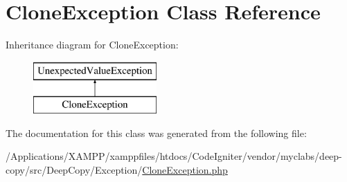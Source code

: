 \hypertarget{class_deep_copy_1_1_exception_1_1_clone_exception}{}\section{Clone\+Exception Class Reference}
\label{class_deep_copy_1_1_exception_1_1_clone_exception}
Inheritance diagram for Clone\+Exception\+:\begin{figure}[H]
\begin{center}
\leavevmode
\includegraphics[height=2.000000cm]{class_deep_copy_1_1_exception_1_1_clone_exception}
\end{center}
\end{figure}


The documentation for this class was generated from the following file\+:\begin{DoxyCompactItemize}
\item 
/\+Applications/\+X\+A\+M\+P\+P/xamppfiles/htdocs/\+Code\+Igniter/vendor/myclabs/deep-\/copy/src/\+Deep\+Copy/\+Exception/\mbox{\hyperlink{_clone_exception_8php}{Clone\+Exception.\+php}}\end{DoxyCompactItemize}
